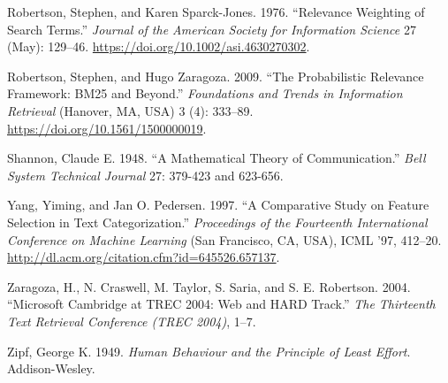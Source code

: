\documentclass[
  letterpaper,
]{scrbook}
\newlength{\cslhangindent}
\newenvironment{CSLReferences}[2] %
 {\begin{list}{}{%
  \setlength{\itemindent}{0pt}
  \setlength{\leftmargin}{0pt}
  \setlength{\parsep}{0pt}
  \ifodd #1
   \setlength{\leftmargin}{\cslhangindent}
   \setlength{\itemindent}{-1\cslhangindent}
  \fi
  \setlength{\itemsep}{#2\baselineskip}}}
 {\end{list}}
\begin{document}
\begin{CSLReferences}{1}{1}
Robertson, Stephen, and Karen Sparck-Jones. 1976. {``Relevance Weighting
of Search Terms.''} \emph{Journal of the American Society for
Information Science} 27 (May): 129--46.
\url{https://doi.org/10.1002/asi.4630270302}.

Robertson, Stephen, and Hugo Zaragoza. 2009. {``The Probabilistic
Relevance Framework: BM25 and Beyond.''} \emph{Foundations and Trends in
Information Retrieval} (Hanover, MA, USA) 3 (4): 333--89.
\url{https://doi.org/10.1561/1500000019}.

Shannon, Claude E. 1948. {``A Mathematical Theory of Communication.''}
\emph{Bell System Technical Journal} 27: 379-423 and 623-656.

Yang, Yiming, and Jan O. Pedersen. 1997. {``A Comparative Study on
Feature Selection in Text Categorization.''} \emph{Proceedings of the
Fourteenth International Conference on Machine Learning} (San Francisco,
CA, USA), ICML '97, 412--20.
\url{http://dl.acm.org/citation.cfm?id=645526.657137}.

Zaragoza, H., N. Craswell, M. Taylor, S. Saria, and S. E. Robertson.
2004. {``Microsoft Cambridge at TREC 2004: Web and HARD Track.''}
\emph{The Thirteenth Text Retrieval Conference (TREC 2004)}, 1--7.

Zipf, George K. 1949. \emph{Human Behaviour and the Principle of Least
Effort}. Addison-Wesley.

\end{CSLReferences}


\backmatter
\end{document}

